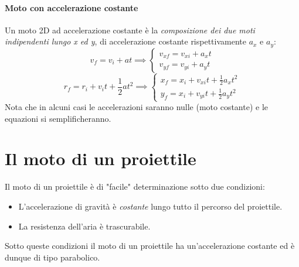 \documentclass[12pt, a4paper, openany]{book}
\begin{document}
\paragraph*{Moto con accelerazione costante}
Un moto 2D ad accelerazione costante è la \emph{composizione dei due moti indipendenti lungo x ed y}, di accelerazione costante rispettivamente $a_x$ e $a_y$:
$$ v_f = v_i + at \implies \begin{cases}
    v_{xf} = v_{xi} +a_xt\\
    v_{yf} = v_{yi} +a_yt 
\end{cases}
$$
$$ r_f = r_i + v_it + \frac{1}{2}at^2 \implies \begin{cases}
    x_f = x_i + v_{xi}t + \frac{1}{2}a_xt^2\\
    y_f = x_i + v_{yi}t + \frac{1}{2}a_yt^2
\end{cases}$$
Nota che in alcuni casi le accelerazioni saranno nulle (moto costante) e le equazioni si semplificheranno.

\section{Il moto di un proiettile}
Il moto di un proiettile è di "facile" determinazione sotto due condizioni:
\begin{itemize}
    \item L'accelerazione di gravità è \emph{costante} lungo tutto il percorso del proiettile.
    \item La resistenza dell'aria è trascurabile.
\end{itemize}
Sotto queste condizioni il moto di un proiettile ha un'accelerazione costante ed è dunque di tipo parabolico.
\end{document}
